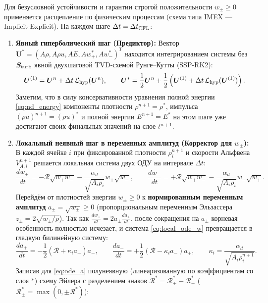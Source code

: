 \documentclass[11pt,a4paper]{article}
\begin{document}
Для безусловной устойчивости и гарантии строгой положительности $w_\pm \ge 0$ применяется расщепление по физическим процессам (схема типа IMEX --- Implicit-Explicit). На каждом шаге $\Delta t = \Delta t_{\rm CFL}$:
\begin{enumerate}
\item \textbf{Явный гиперболический шаг (Предиктор):} Вектор $\bm{U}^* = (A\rho, A\rho u, A E, A w_+^*, A w_-^*)^T$ находится интегрированием системы без $\bm{S}_{\rm turb}$ явной двухшаговой TVD-схемой Рунге--Кутты (SSP-RK2):
\begin{equation}
\bm{U}^{(1)} = \bm{U}^n + \Delta t\,\mathcal{L}_{\rm hyp}(\bm{U}^n), \qquad
\bm{U}^* = \frac{1}{2}\bm{U}^n + \frac{1}{2}\left(\bm{U}^{(1)} + \Delta t\,\mathcal{L}_{\rm hyp}(\bm{U}^{(1)})\right).
\label{eq:ssprk2}
\end{equation}
Заметим, что в силу консервативности уравнения полной энергии \eqref{eq:nd_energy} компоненты плотности $\rho^{n+1} = \rho^*$, импульса $(\rho u)^{n+1} = (\rho u)^*$ и полной энергии $E^{n+1} = E^*$ на этом шаге уже достигают своих финальных значений на слое $t^{n+1}$.
\item \textbf{Локальный неявный шаг в переменных амплитуд (Корректор для $w_\pm$):} В каждой ячейке $i$ при фиксированной плотности $\rho_i^{n+1}$ и скорости Альфвена $V_{A,i}^{n+1}$ решается локальная система двух ОДУ на интервале $\Delta t$:
\begin{equation}
\frac{dw_+}{dt} = -\mathcal{R}\sqrt{w_+ w_-} - \frac{\alpha_d}{\sqrt{A_i\rho_i}}w_+\sqrt{w_-}, \qquad
\frac{dw_-}{dt} = +\mathcal{R}\sqrt{w_+ w_-} - \frac{\alpha_d}{\sqrt{A_i\rho_i}}w_-\sqrt{w_+}.
\label{eq:local_ode_w}
\end{equation}
Перейдём от плотностей энергии $w_\pm \ge 0$ к \textbf{нормированным переменным амплитуд} $a_\pm = \sqrt{w_\pm} \ge 0$ (пропорциональным переменным Эльзассера $z_\pm = 2\sqrt{w_\pm/\rho}$). Так как $\frac{dw_\pm}{dt} = 2 a_\pm\frac{da_\pm}{dt}$, после сокращения на $a_\pm$ корневая особенность полностью исчезает, и система \eqref{eq:local_ode_w} превращается в гладкую билинейную систему:
\begin{equation}
\frac{da_+}{dt} = -\frac{1}{2}\left(\mathcal{R} + \kappa_i a_+\right)a_-, \qquad
\frac{da_-}{dt} = +\frac{1}{2}\left(\mathcal{R} - \kappa_i a_-\right)a_+, \qquad
\kappa_i = \frac{\alpha_d}{\sqrt{A_i\rho_i^{n+1}}}.
\label{eq:ode_a}
\end{equation}
Записав для \eqref{eq:ode_a} полунеявную (линеаризованную по коэффициентам со слоя $*$) схему Эйлера с разделением знаков $\mathcal{R}^* = \mathcal{R}_+^* - \mathcal{R}_-^*$ ($\mathcal{R}_\pm^* = \max(0, \pm\mathcal{R}^*)$):

\end{enumerate}
\end{document}
